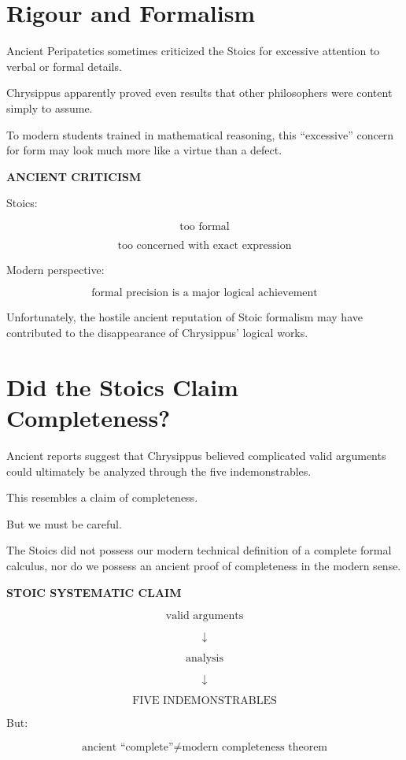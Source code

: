 \documentclass[11pt]{article}
\begin{document}
\section{Rigour and Formalism}

Ancient Peripatetics sometimes criticized the Stoics for excessive
attention to verbal or formal details.

Chrysippus apparently proved even results that other philosophers
were content simply to assume.

To modern students trained in mathematical reasoning, this
``excessive'' concern for form may look much more like a virtue
than a defect.

\begin{whiteboard}
\textbf{ANCIENT CRITICISM}

Stoics:

\[
\text{too formal}
\]

\[
\text{too concerned with exact expression}
\]

Modern perspective:

\[
\boxed{
\text{formal precision is a major logical achievement}
}
\]
\end{whiteboard}

Unfortunately, the hostile ancient reputation of Stoic formalism
may have contributed to the disappearance of Chrysippus'
logical works.

\section{Did the Stoics Claim Completeness?}

Ancient reports suggest that Chrysippus believed complicated valid
arguments could ultimately be analyzed through the five
indemonstrables.

This resembles a claim of completeness.

But we must be careful.

The Stoics did not possess our modern technical definition of a
complete formal calculus, nor do we possess an ancient proof of
completeness in the modern sense.

\begin{whiteboard}
\textbf{STOIC SYSTEMATIC CLAIM}

\[
\text{valid arguments}
\]

\[
\downarrow
\]

\[
\text{analysis}
\]

\[
\downarrow
\]

\[
\boxed{\text{FIVE INDEMONSTRABLES}}
\]

But:

\[
\boxed{
\text{ancient ``complete''}
\neq
\text{modern completeness theorem}
}
\]
\end{whiteboard}
\end{document}
